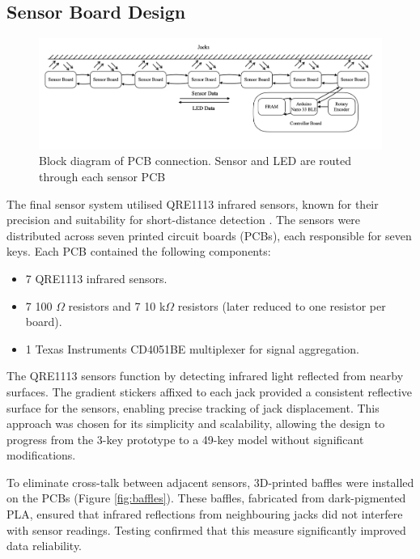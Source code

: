 \subsection{Sensor Board Design}\label{sensor-board}

\begin{figure}
    \centering
    \includegraphics[width=\linewidth]{src/images/system-block-diagram-long.png}
    \caption{Block diagram of PCB connection. Sensor and LED are routed through each sensor PCB}
    \label{fig:system-block-diagram}
\end{figure}

The final sensor system utilised QRE1113 infrared sensors, known for their precision and suitability for short-distance detection \cite{McPherson2013, McPherson2019}. The sensors were distributed across seven printed circuit boards (PCBs), each responsible for seven keys. Each PCB contained the following components:

\begin{itemize}
    \item 7 QRE1113 infrared sensors.
    \item 7 100 $\Omega$ resistors and 7 10 k$\Omega$ resistors (later reduced to one resistor per board).
    \item 1 Texas Instruments CD4051BE multiplexer for signal aggregation.
\end{itemize}

The QRE1113 sensors function by detecting infrared light reflected from nearby surfaces. The gradient stickers affixed to each jack provided a consistent reflective surface for the sensors, enabling precise tracking of jack displacement. This approach was chosen for its simplicity and scalability, allowing the design to progress from the 3-key prototype to a 49-key model without significant modifications.

To eliminate cross-talk between adjacent sensors, 3D-printed baffles were installed on the PCBs (Figure \ref{fig:baffles}). These baffles, fabricated from dark-pigmented PLA, ensured that infrared reflections from neighbouring jacks did not interfere with sensor readings. Testing confirmed that this measure significantly improved data reliability.

